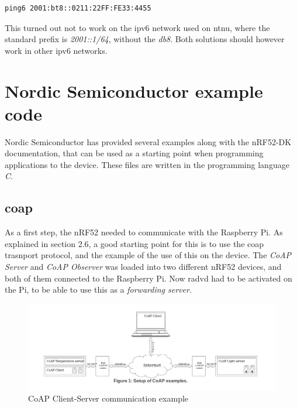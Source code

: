 \begin{verbatim}
ping6 2001:bt8::0211:22FF:FE33:4455
\end{verbatim}

This turned out not to work on the \gls{ipv6} network used on \gls{ntnu}, where the standard prefix is \textit{2001::1/64}, without the \textit{db8}. Both solutions should however work in other \gls{ipv6} networks. 






\section{Nordic Semiconductor example code}

Nordic Semiconductor has provided several examples along with the nRF52-DK documentation, that can be used as a starting point when programming applications to the device. These files are written in the programming language \textit{C}. 

\subsection{\gls{coap}}

As a first step, the nRF52 needed to communicate with the Raspberry Pi. As explained in section 2.6, a good starting point for this is to use the \gls{coap} trasnport protocol, and the example of the use of this on the device. The \textit{CoAP Server} and \textit{CoAP Observer} was loaded into two different nRF52 devices, and both of them connected to the Raspberry Pi. Now \gls{radvd} had to be activated on the Pi, to be able to use this as a \textit{forwarding server}. 

\begin{figure}[ht]
    \centering
    \includegraphics[scale=0.47]{CoAPExample.png}    
    \caption{CoAP Client-Server communication example}
    \label{fig:CoAPexample1}
\end{figure}


